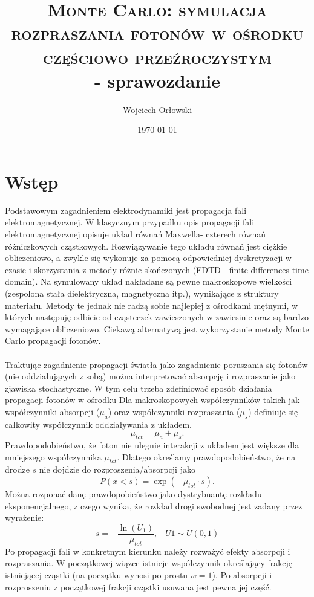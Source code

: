 \documentclass[a4paper, 12pt]{article}
\author{Wojciech Orłowski}
\date{\today}
\title{\textsc{Monte Carlo: symulacja rozpraszania fotonów w ośrodku częściowo
		przeźroczystym}\\ - sprawozdanie}
\begin{document}
	\maketitle
	
	\section*{Wstęp}
	
	Podstawowym zagadnieniem elektrodynamiki jest propagacja fali elektromagnetycznej.
	W klasycznym przypadku opis propagacji fali elektromagnetycznej opisuje układ równań Maxwella- czterech równań różniczkowych cząstkowych. 
	Rozwiązywanie tego układu równań jest ciężkie obliczeniowo, a zwykle się wykonuje za pomocą odpowiedniej dyskretyzacji w czasie i skorzystania z metody różnic skończonych (FDTD - finite differences time domain).
	Na symulowany układ nakładane są pewne makroskopowe wielkości (zespolona stała dielektryczna, magnetyczna itp.), wynikające z struktury materiału. 
	Metody te jednak nie radzą sobie najlepiej z ośrodkami mętnymi, w których następuję odbicie od cząsteczek zawieszonych w zawiesinie oraz są bardzo wymagające obliczeniowo.
	Ciekawą alternatywą jest wykorzystanie metody Monte Carlo propagacji fotonów.
	\\
	\\
	Traktując zagadnienie propagacji światła jako zagadnienie poruszania się fotonów (nie oddziałujących z sobą) można interpretować absorpcję i rozpraszanie jako zjawiska stochastyczne.
	W tym celu trzeba zdefiniować sposób działania propagacji fotonów w ośrodku
	Dla makroskopowych współczynników takich jak współczynniki absorpcji ($\mu_a$) oraz współczynniki rozpraszania ($\mu_s$) definiuje się całkowity współczynnik oddziaływania z układem.
	\[ \mu_{tot} = \mu_a + \mu_s. \]
	Prawdopodobieństwo, że foton nie ulegnie interakcji z układem jest większe dla mniejszego współczynnika $\mu_{tot}$. 
	Dlatego określamy prawdopodobieństwo, że na drodze $s$ nie dojdzie do rozproszenia/absorpcji jako
	\[ P(x < s) = \exp(-\mu_{tot}\cdot s). \] 
	Można rozponać danę prawdopobieństwo jako dystrybuantę rozkładu eksponencjalnego, z czego wynika, że rozkład drogi swobodnej jest zadany przez wyrażenie:
	\[ s = -\frac{\ln(U_1)}{\mu_{tot}}, \; \; \; U1 \sim U(0,1)\] 
	Po propagacji fali w konkretnym kierunku należy rozważyć efekty absorpcji i rozpraszania.
	W początkowej wiązce istnieje współczynnik określający frakcję istniejącej cząstki (na początku wynosi po prostu $w = 1$).
	Po absorpcji i rozproszeniu z początkowej frakcji cząstki usuwana jest pewna jej część.
\end{document}
